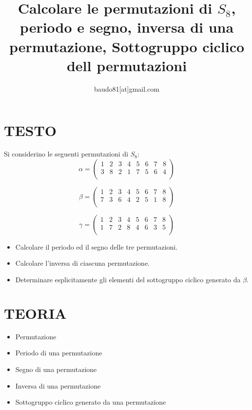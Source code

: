\documentclass[a4paper,10pt]{article}
\title{Calcolare le permutazioni di $S_{8}$, periodo e segno, inversa di una permutazione, Sottogruppo ciclico dell permutazioni}
\author{baudo81[at]gmail.com}
\begin{document}
\maketitle


\section{TESTO}
Si considerino le seguenti permutazioni di $S_{8}$:
\[
 \alpha = \left( \begin{array}{cccccccc}
                  1 & 2 & 3 & 4 & 5 & 6 & 7 & 8 \\
                  3 & 8 & 2 & 1 & 7 & 5 & 6 & 4 \\
                 \end{array}
 \right)
\]

\[
  \beta = \left( \begin{array}{cccccccc}
                  1 & 2 & 3 & 4 & 5 & 6 & 7 & 8 \\
                  7 & 3 & 6 & 4 & 2 & 5 & 1 & 8 \\
                 \end{array}
 \right)
\]

\[
  \gamma = \left( \begin{array}{cccccccc}
                  1 & 2 & 3 & 4 & 5 & 6 & 7 & 8 \\
                  1 & 7 & 2 & 8 & 4 & 6 & 3 & 5 \\
                 \end{array}
 \right)
\]

\begin{itemize}
 \item Calcolare il periodo ed il segno delle tre permutazioni.
 \item Calcolare l'inversa di ciascuna permutazione.
 \item Determinare esplicitamente gli elementi del sottogruppo ciclico generato da $\beta$.
\end{itemize}


\section{TEORIA}
  \begin{itemize}
   \item Permutazione
   \item Periodo di una permutazione
   \item Segno di una permutazione
   \item Inversa di una permutazione
   \item Sottogruppo ciclico generato da una permutazione
  \end{itemize}
\end{document}
